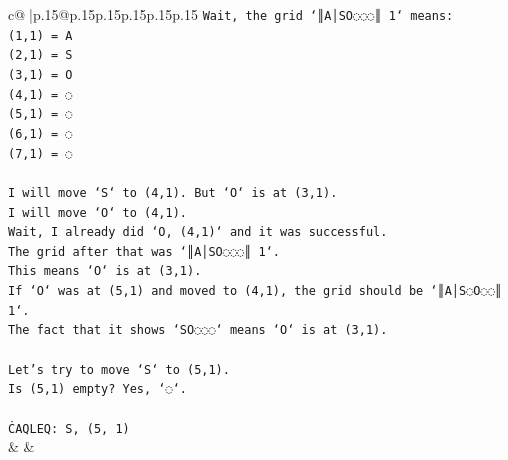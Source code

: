 \documentclass{article}
\begin{document}
{\begin{supertabular}{c@{$\;$}|p{.15\linewidth}@{}p{.15\linewidth}p{.15\linewidth}p{.15\linewidth}p{.15\linewidth}p{.15\linewidth}}
{{{\texttt{Wait, the grid `║A│SO◌◌◌║ 1` means:} \\
\texttt{(1,1) = A} \\
\texttt{(2,1) = S} \\
\texttt{(3,1) = O} \\
\texttt{(4,1) = ◌} \\
\texttt{(5,1) = ◌} \\
\texttt{(6,1) = ◌} \\
\texttt{(7,1) = ◌} \\
\\ 
\texttt{I will move `S` to (4,1). But `O` is at (3,1).} \\
\texttt{I will move `O` to (4,1).} \\
\texttt{Wait, I already did `O, (4,1)` and it was successful.} \\
\texttt{The grid after that was `║A│SO◌◌◌║ 1`.} \\
\texttt{This means `O` is at (3,1).} \\
\texttt{If `O` was at (5,1) and moved to (4,1), the grid should be `║A│S◌O◌◌║ 1`.} \\
\texttt{The fact that it shows `SO◌◌◌` means `O` is at (3,1).} \\
\\ 
\texttt{Let's try to move `S` to (5,1).} \\
\texttt{Is (5,1) empty? Yes, `◌`.} \\
\\ 
\texttt{ĊAQLEQ: S, (5, 1)} \\
            }
        }
    }
    & & \\ \\


\end{supertabular}}
\end{document}
